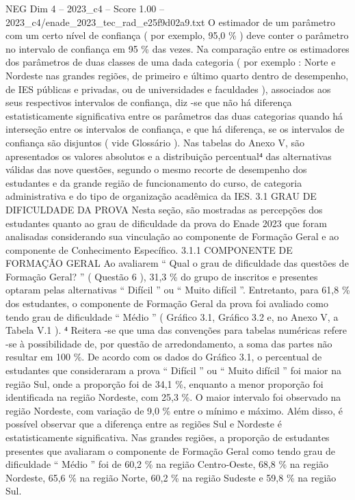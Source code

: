 \begin{textsample}{NEG Dim 4 – 2023\_c4 – Score 1.00 – 2023\_c4/enade\_2023\_tec\_rad\_e25f9d02a9.txt}
O estimador de um parâmetro com um certo nível de confiança ( por exemplo, 95,0 \% ) deve conter o parâmetro no intervalo de confiança em 95 \% das vezes.
Na comparação entre os estimadores dos parâmetros de duas classes de uma dada categoria ( por exemplo : Norte e Nordeste nas grandes regiões, de primeiro e último quarto dentro de desempenho, de IES públicas e privadas, ou de universidades e faculdades ), associados aos seus respectivos intervalos de confiança, diz -se que não há diferença estatisticamente significativa entre os parâmetros das duas categorias quando há interseção entre os intervalos de confiança, e que há diferença, se os intervalos de confiança são disjuntos ( vide Glossário ).
Nas tabelas do Anexo V, são apresentados os valores absolutos e a distribuição percentual⁴ das alternativas válidas das nove questões, segundo o mesmo recorte de desempenho dos estudantes e da grande região de funcionamento do curso, de categoria administrativa e do tipo de organização acadêmica da IES. 3.1 GRAU DE DIFICULDADE DA PROVA Nesta seção, são mostradas as percepções dos estudantes quanto ao grau de dificuldade da prova do Enade 2023 que foram analisadas considerando sua vinculação ao componente de Formação Geral e ao componente de Conhecimento Específico. 3.1.1 COMPONENTE DE FORMAÇÃO GERAL Ao avaliarem “ Qual o grau de dificuldade das questões de Formação Geral? ” ( Questão 6 ), 31,3 \% do grupo de inscritos e presentes optaram pelas alternativas “ Difícil ” ou “ Muito difícil ”.
Entretanto, para 61,8 \% dos estudantes, o componente de Formação Geral da prova foi avaliado como tendo grau de dificuldade “ Médio ” ( Gráfico 3.1, Gráfico 3.2 e, no Anexo V, a Tabela V.1 ). ⁴ Reitera -se que uma das convenções para tabelas numéricas refere -se à possibilidade de, por questão de arredondamento, a soma das partes não resultar em 100 \%.
De acordo com os dados do Gráfico 3.1, o percentual de estudantes que consideraram a prova “ Difícil ” ou “ Muito difícil ” foi maior na região Sul, onde a proporção foi de 34,1 \%, enquanto a menor proporção foi identificada na região Nordeste, com 25,3 \%.
O maior intervalo foi observado na região Nordeste, com variação de 9,0 \% entre o mínimo e máximo.
Além disso, é possível observar que a diferença entre as regiões Sul e Nordeste é estatisticamente significativa.
Nas grandes regiões, a proporção de estudantes presentes que avaliaram o componente de Formação Geral como tendo grau de dificuldade “ Médio ” foi de 60,2 \% na região Centro-Oeste, 68,8 \% na região Nordeste, 65,6 \% na região Norte, 60,2 \% na região Sudeste e 59,8 \% na região Sul.

\end{textsample}

